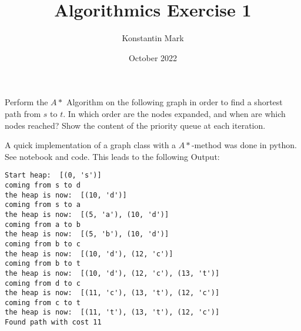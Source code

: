 \documentclass{article}
\title{Algorithmics Exercise 1}
\author{Konstantin Mark}
\date{October 2022}
\begin{document}
\maketitle

\begin{exercise}[$A*$ Algorithm]
    Perform the $A*$ Algorithm on the following graph in order to find a shortest path from $s$ to $t$. In which order are the nodes expanded, and when are which nodes reached? Show the content of the priority queue at each iteration.

\end{exercise}
\begin{solving}
    A quick implementation of a graph class with a $A*$-method was done in python. See notebook and code. This leads to the following Output:
    \begin{verbatim}
Start heap:  [(0, 's')]
coming from s to d
the heap is now:  [(10, 'd')]
coming from s to a
the heap is now:  [(5, 'a'), (10, 'd')]
coming from a to b
the heap is now:  [(5, 'b'), (10, 'd')]
coming from b to c
the heap is now:  [(10, 'd'), (12, 'c')]
coming from b to t
the heap is now:  [(10, 'd'), (12, 'c'), (13, 't')]
coming from d to c
the heap is now:  [(11, 'c'), (13, 't'), (12, 'c')]
coming from c to t
the heap is now:  [(11, 't'), (13, 't'), (12, 'c')]
Found path with cost 11
\end{verbatim}
\end{solving}
\newpage
\end{document}
